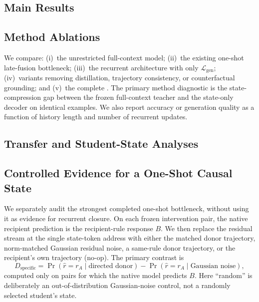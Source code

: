 
\subsection{Main Results}


\subsection{Method Ablations}

We compare: (i)~the unrestricted full-context model; (ii)~the existing
one-shot late-fusion bottleneck; (iii)~the recurrent architecture with only
$\mathcal L_{\mathrm{gen}}$; (iv)~variants removing distillation, trajectory
consistency, or counterfactual grounding; and (v)~the complete \model.  The
primary method diagnostic is the state-compression gap between the frozen
full-context teacher and the state-only decoder on identical examples.  We
also report accuracy or generation quality as a function of history length and
number of recurrent updates.

\subsection{Transfer and Student-State Analyses}


\subsection{Controlled Evidence for a One-Shot Causal State}
\label{sec:c4-one-shot}

We separately audit the strongest completed one-shot bottleneck, without
using it as evidence for recurrent closure.  On each frozen intervention pair,
the native recipient prediction is the recipient-rule response $B$.  We then
replace the residual stream at the single state-token address with either the
matched donor trajectory, norm-matched Gaussian residual noise, a same-rule
donor trajectory, or the recipient's own trajectory (no-op).  The primary
contrast is
\begin{equation}
    D_{\mathrm{specific}}
    = \Pr(\widehat r=r_A\mid\text{directed donor})
    - \Pr(\widehat r=r_A\mid\text{Gaussian noise}),
\end{equation}
computed only on pairs for which the native model predicts $B$.  Here
``random'' is deliberately an out-of-distribution Gaussian-noise control, not
a randomly selected student's state.


